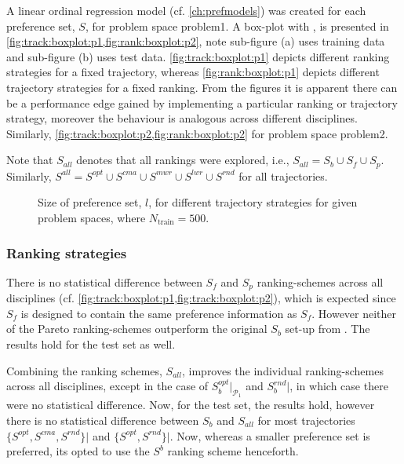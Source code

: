 A linear ordinal regression model (cf. \cref{ch:prefmodels}) was created for each preference set, $S$, for problem space problem{1}. A box-plot with \fullnamerho, is presented in \cref{fig:track:boxplot:p1,fig:rank:boxplot:p2}, note sub-figure (a) uses training data and sub-figure (b) uses test data. \cref{fig:track:boxplot:p1} depicts different ranking strategies for a fixed trajectory, whereas \cref{fig:rank:boxplot:p1} depicts different trajectory strategies for a fixed ranking. 
From the figures it is apparent there can be a performance edge gained by implementing a particular ranking or trajectory strategy, moreover the behaviour is analogous across different disciplines. Similarly, \cref{fig:track:boxplot:p2,fig:rank:boxplot:p2} for problem space problem{2}.


Note that $S_{all}$ denotes that all rankings were explored, i.e., $S_{all}=S_b\cup S_f\cup S_p$. Similarly, $S^{all}=S^{opt}\cup S^{cma}\cup S^{mwr}\cup S^{lwr} \cup S^{rnd}$ for all trajectories.

\begin{figure}
\caption{Size of preference set, $l$, for different trajectory strategies for given problem spaces, where $N_{\text{train}}=500$. }
\label{fig:sizeofprefset:p1}
\end{figure}


\subsubsection{Ranking strategies}
There is no statistical difference between $S_f$ and $S_p$ ranking-schemes across all disciplines (cf. \cref{fig:track:boxplot:p1,fig:track:boxplot:p2}), which is expected since $S_f$ is designed to contain the same preference information as $S_f$. However neither of the Pareto ranking-schemes outperform the original $S_b$ set-up from \cite{InRu11a}. The results hold for the test set as well. 

Combining the ranking schemes, $S_{all}$, improves the individual ranking-schemes across all disciplines, except in the case of $S_b^{opt}\big|_{\mathcal{P_1}}$ and $S_b^{rnd}\big|$\!, in which case there were no statistical difference. Now, for the test set, the results hold, however there is no statistical difference between $S_b$ and $S_{all}$ for most trajectories $\{S^{opt},S^{cma},S^{rnd}\}\big|$\! and  $\{S^{opt},S^{rnd}\}\big|$\!. Now, whereas a smaller preference set is preferred, its opted to use the $S^{b}$ ranking scheme henceforth. 

